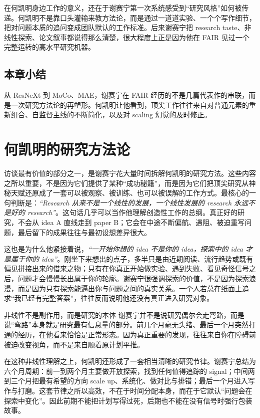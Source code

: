 \documentclass[a4paper,12pt]{article}
\begin{document}
在何凯明身边工作的意义，还在于谢赛宁第一次系统感受到“研究风格”如何被传递。何凯明不是靠口头灌输来教方法论，而是通过一道道实验、一个个写作细节，把对问题本质的追问变成团队默认的工作标准。后来谢赛宁把 research taste、非线性探索、论文叙事都说得那么清楚，很大程度上正是因为他在 FAIR 见过一个完整运转的高水平研究机器。

\subsection{本章小结}

从 ResNeXt 到 MoCo、MAE，谢赛宁在 FAIR 经历的不是几篇代表作的串联，而是一次研究方法论的再塑形。何凯明让他看到，顶尖工作往往来自对普通元素的重新组合、自监督主线的不断简化，以及对 scaling 幻觉的及时修正。

\section{何凯明的研究方法论}

访谈最有价值的部分之一，是谢赛宁花大量时间拆解何凯明的研究方法。这些内容之所以重要，不是因为它们提供了某种“成功秘籍”，而是因为它们把顶尖研究从神秘天赋还原成了一套可以被观察、被训练、也可以被误解的工作方式。最核心的一句判断是：\textit{``Research 从来不是一个线性的发展，一个线性发展的 research 永远不是好的 research''}。这句话几乎可以当作他理解创造性工作的总纲。真正好的研究，不会从 idea A 直线走到 paper B；它会在中途不断偏航、遇阻、被迫重写问题，最后留下的成果往往与最初设想差异很大。

这也是为什么他紧接着说，\textit{``一开始你想的 idea 不是你的 idea，探索中的 idea 才是属于你的 idea''}。刚坐下来想出的点子，多半只是由近期阅读、流行趋势或既有偏见拼接出来的借来之物；只有在你真正开始做实验、遇到失败、看见奇怪信号之后，问题才会慢慢长出属于你的轮廓。谢赛宁很强调探索的价值，不是因为探索浪漫，而是因为只有探索能逼出你与问题之间的真实关系。一个人若总在纸面上追求“我已经有完整答案”，往往反而说明他还没有真正进入研究对象。

\begin{importantbox}{非线性不是副作用，而是研究的本体}
谢赛宁并不是说研究偶尔会走弯路，而是说“弯路”本身就是研究最有信息量的部分。前几个月毫无头绪、最后一个月突然打通的经历，在他看来恰恰是正常形态。因为真正重要的发现，往往来自你在障碍前被迫改变视角，而不是来自顺着原计划平推。
\end{importantbox}

在这种非线性理解之上，何凯明还形成了一套相当清晰的研究节律。谢赛宁总结为六个月周期：前一到两个月主要做开放探索，找到任何值得追踪的 signal；中间两到三个月把最有希望的方向 scale up、系统化、做对比与排错；最后一个月进入写作与打磨。这套节律之所以高效，不在于时间分配本身，而在于它默认“问题会在探索中变化”。因此前期不能把计划写得过死，后期也不能在没有信号时强行包装故事。
\end{document}
